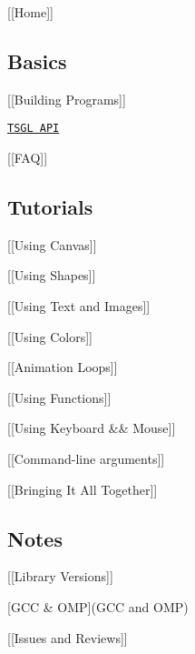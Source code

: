 \mbox{[}\mbox{[}Home\mbox{]}\mbox{]}

\subsection*{Basics}


\begin{DoxyItemize}
\item \mbox{[}\mbox{[}Building Programs\mbox{]}\mbox{]}
\item \href{http://calvin-cs.github.io/TSGL/html/annotated.html}{\tt T\-S\-G\-L A\-P\-I}
\item \mbox{[}\mbox{[}F\-A\-Q\mbox{]}\mbox{]}
\end{DoxyItemize}

\subsection*{Tutorials}


\begin{DoxyItemize}
\item \mbox{[}\mbox{[}Using Canvas\mbox{]}\mbox{]}
\item \mbox{[}\mbox{[}Using Shapes\mbox{]}\mbox{]}
\item \mbox{[}\mbox{[}Using Text and Images\mbox{]}\mbox{]}
\item \mbox{[}\mbox{[}Using Colors\mbox{]}\mbox{]}
\item \mbox{[}\mbox{[}Animation Loops\mbox{]}\mbox{]}
\item \mbox{[}\mbox{[}Using Functions\mbox{]}\mbox{]}
\item \mbox{[}\mbox{[}Using Keyboard \&\& Mouse\mbox{]}\mbox{]}
\item \mbox{[}\mbox{[}Command-\/line arguments\mbox{]}\mbox{]}
\item \mbox{[}\mbox{[}Bringing It All Together\mbox{]}\mbox{]}
\end{DoxyItemize}

\subsection*{Notes}


\begin{DoxyItemize}
\item \mbox{[}\mbox{[}Library Versions\mbox{]}\mbox{]}
\item \mbox{[}G\-C\-C \& O\-M\-P\mbox{]}(G\-C\-C and O\-M\-P)
\item \mbox{[}\mbox{[}Issues and Reviews\mbox{]}\mbox{]} 
\end{DoxyItemize}
